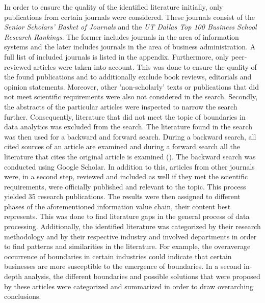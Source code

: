 In order to ensure the quality of the identified literature initially, only publications from certain journals were considered. These journals consist of the \textit{Senior Scholars' Basket of Journals} and the \textit{UT Dallas Top 100 Business School Research Rankings}. The former includes journals in the area of information systems and the later includes journals in the area of business administration. A full list of included journals is listed in the appendix. Furthermore, only peer-reviewed articles were taken into account. This was done to ensure the quality of the found publications and to additionally exclude book reviews, editorials and opinion statements. Moreover, other 'non-scholarly' texts or publications that did not meet scientific requirements were also not considered in the search. Secondly, the abstracts of the particular articles were inspected to narrow the search further. Consequently, literature that did not meet the topic of boundaries in data analytics was excluded from the search. %
The literature found in the search was then used for a backward and forward search. During a backward search, all cited sources of an article are examined and during a forward search all the literature that cites the original article is examined (\cite{Webster.2002}). The backward search was conducted using Google Scholar. In addition to this, articles from other journals were, in a second step, reviewed and included as well if they met the scientific requirements, were officially published and relevant to the topic. This process yielded 35 research publications. The results were then assigned to different phases of the aforementioned information value chain, their content best represents. This was done to find literature gaps in the general process of data processing. Additionally, the identified literature was categorized by their research methodology and by their respective industry and involved departments in order to find patterns and similarities in the literature. For example, the overaverage occurrence of boundaries in certain industries could indicate that certain businesses are more susceptible to the emergence of boundaries. In a second in-depth analysis, the different boundaries and possible solutions that were proposed by these articles were categorized and summarized in order to draw overarching conclusions.



